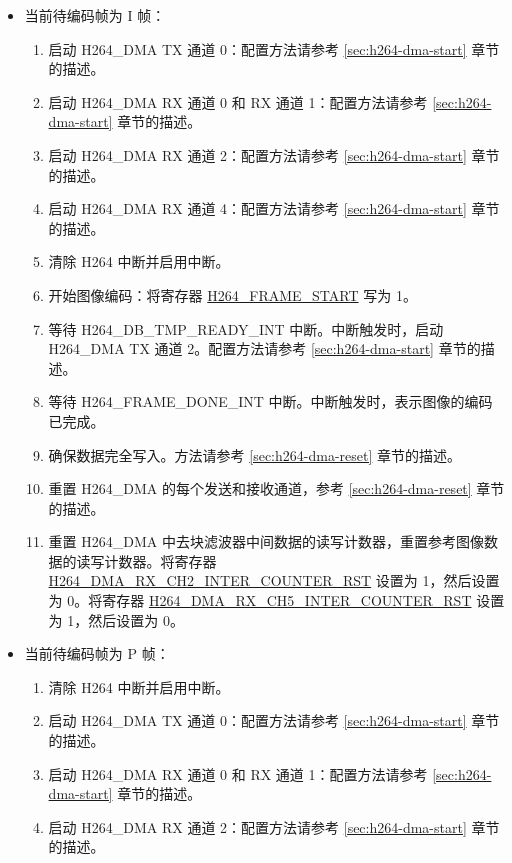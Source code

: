 \documentclass[main\_\_CN.tex]{subfiles}
\begin{document}
\begin{enumerate}
    \begin{itemize}
        \item 当前待编码帧为 I 帧：
        \begin{enumerate}
            \item 启动 H264\_DMA TX 通道 0：配置方法请参考 \ref{sec:h264-dma-start} 章节的描述。
            \item 启动 H264\_DMA RX 通道 0 和 RX 通道 1：配置方法请参考 \ref{sec:h264-dma-start} 章节的描述。
            \item 启动 H264\_DMA RX 通道 2：配置方法请参考 \ref{sec:h264-dma-start} 章节的描述。
            \item 启动 H264\_DMA RX 通道 4：配置方法请参考 \ref{sec:h264-dma-start} 章节的描述。
            \item 清除 H264 中断并启用中断。
            \item 开始图像编码：将寄存器 \hyperref[fielddesc:H264FRAMESTART]{H264\_FRAME\_START} 写为 1。
            \item 等待 H264\_DB\_TMP\_READY\_INT 中断。中断触发时，启动 H264\_DMA TX 通道 2。配置方法请参考 \ref{sec:h264-dma-start} 章节的描述。
            \item 等待 H264\_FRAME\_DONE\_INT 中断。中断触发时，表示图像的编码已完成。
            \item 确保数据完全写入。方法请参考 \ref{sec:h264-dma-reset} 章节的描述。
            \item 重置 H264\_DMA 的每个发送和接收通道，参考 \ref{sec:h264-dma-reset} 章节的描述。
            \item 重置 H264\_DMA 中去块滤波器中间数据的读写计数器，重置参考图像数据的读写计数器。将寄存器 \hyperref[fielddesc:H264DMARXCH2INTERCOUNTERRST]{H264\_DMA\_RX\_CH2\_INTER\_COUNTER\_RST} 设置为 1，然后设置为 0。将寄存器 \hyperref[fielddesc:H264DMARXCH5INTERCOUNTERRST]{H264\_DMA\_RX\_CH5\_INTER\_COUNTER\_RST} 设置为 1，然后设置为 0。
        \end{enumerate}
        \item 当前待编码帧为 P 帧：
        \begin{enumerate}
            \item 清除 H264 中断并启用中断。
            \item 启动 H264\_DMA TX 通道 0：配置方法请参考 \ref{sec:h264-dma-start} 章节的描述。
            \item 启动 H264\_DMA RX 通道 0 和 RX 通道 1：配置方法请参考 \ref{sec:h264-dma-start} 章节的描述。
            \item 启动 H264\_DMA RX 通道 2：配置方法请参考 \ref{sec:h264-dma-start} 章节的描述。

\end{enumerate}
\end{itemize}
\end{enumerate}
\end{document}
